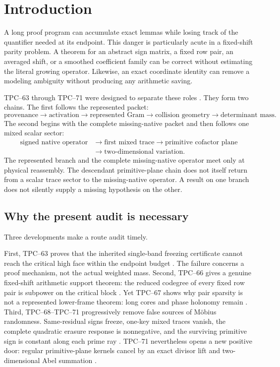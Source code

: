 \section{Introduction}
\label{sec:introduction}

A long proof program can accumulate exact lemmas while losing track of the
quantifier needed at its endpoint.  This danger is particularly acute in a
fixed-shift parity problem.  A theorem for an abstract sign matrix, a fixed
row pair, an averaged shift, or a smoothed coefficient family can be correct
without estimating the literal growing operator.  Likewise, an exact
coordinate identity can remove a modeling ambiguity without producing any
arithmetic saving.

TPC--63 through TPC--71 were designed to separate these roles
\citep{WangTPC63,WangTPC64,WangTPC65,WangTPC66,WangTPC67,WangTPC68,WangTPC69,WangTPC70,WangTPC71}.
They form two chains.  The first follows the represented packet:
\[
\text{provenance}
\longrightarrow
\text{activation}
\longrightarrow
\text{represented Gram}
\longrightarrow
\text{collision geometry}
\longrightarrow
\text{determinant mass}.
\]
The second begins with the complete missing-native packet and then follows
one mixed scalar sector:
\[
\begin{aligned}
\text{signed native operator}
&\longrightarrow
\text{first mixed trace}
\longrightarrow
\text{primitive cofactor plane}\\
&\longrightarrow
\text{two-dimensional variation}.
\end{aligned}
\]
The represented branch and the complete missing-native operator meet only
at physical reassembly.  The descendant primitive-plane chain does not
itself return from a scalar trace sector to the missing-native operator.
A result on one branch does not silently supply a missing hypothesis on
the other.

\subsection{Why the present audit is necessary}

Three developments make a route audit timely.

First, TPC--63 proves that the inherited single-band freezing certificate
cannot reach the critical high face within the endpoint budget
\citep{WangTPC63}.  The failure concerns a proof mechanism, not the actual
weighted mass.  Second, TPC--66 gives a genuine fixed-shift arithmetic
support theorem: the reduced codegree of every fixed row pair is subpower
on the critical block \citep{WangTPC66}.  Yet TPC--67 shows why pair
sparsity is not a represented lower-frame theorem: long cores and phase
holonomy remain \citep{WangTPC67}.  Third, TPC--68--TPC--71 progressively
remove false sources of M\"obius randomness.  Same-residual signs freeze,
one-key mixed traces vanish, the complete quadratic erasure response is
nonnegative, and the surviving primitive sign is constant along each
prime ray \citep{WangTPC68,WangTPC69,WangTPC70}.  TPC--71 nevertheless
opens a new positive door: regular primitive-plane kernels cancel by an
exact divisor lift and two-dimensional Abel summation
\citep{WangTPC71}.

